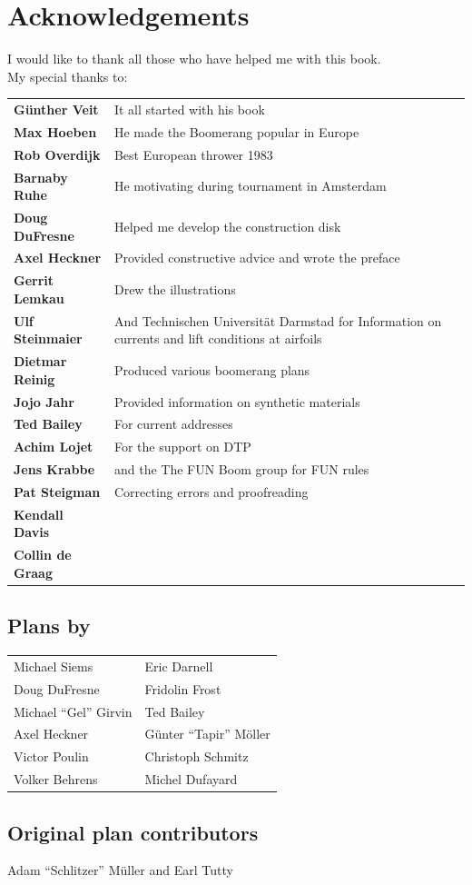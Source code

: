 \section*{Acknowledgements}
I would like to thank all those who have helped me with this book.\\

My special thanks to:

\begin{tabulary}{30em}{>{\bfseries}lL}
Günther Veit				& It all started with his book\\ 
Max Hoeben				& He made the Boomerang popular in Europe\\
Rob Overdijk			& Best European thrower 1983\\
Barnaby Ruhe 			& He motivating during tournament in Amsterdam\\
Doug DuFresne		& Helped me develop the construction disk\\
Axel Heckner 			& Provided constructive advice and wrote the preface\\
Gerrit Lemkau 			& Drew the illustrations\\
Ulf Steinmaier			& And Technischen Universität Darmstad for Information on currents and lift conditions at airfoils\\
Dietmar Reinig 		& Produced various boomerang plans\\
Jojo Jahr					& Provided information on synthetic materials\\
Ted Bailey				& For current addresses\\
Achim Lojet				& For the support on DTP\\
Jens Krabbe				& and the The FUN Boom group for FUN rules\\
Pat Steigman			& Correcting errors and proofreading\\
Kendall Davis			& \\
Collin de Graag			& \\
 
\end{tabulary}
\subsection*{Plans by}
\begin{tabulary}{30em}{LL}
Michael Siems & Eric Darnell\\
Doug DuFresne & Fridolin Frost\\
Michael ``Gel'' Girvin & Ted Bailey\\
Axel Heckner & Günter ``Tapir'' Möller\\
Victor Poulin & Christoph Schmitz\\
Volker Behrens & Michel Dufayard
\end{tabulary}
\subsection*{Original plan contributors}
Adam ``Schlitzer'' Müller and Earl Tutty
